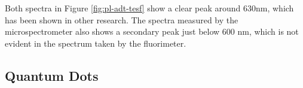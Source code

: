 
Both spectra in Figure \ref{fig:pl-adt-tesf} show a clear peak around 630nm, which has been shown in other research.\cite{lam_polarization_2018}\cite{ostroverkhova_organic_2016}\cite{platt_optical_2009} The spectra measured by the microspectrometer also shows a secondary peak just below 600 nm, which is not evident in the spectrum taken by the fluorimeter. 


\subsection{ Quantum Dots}

